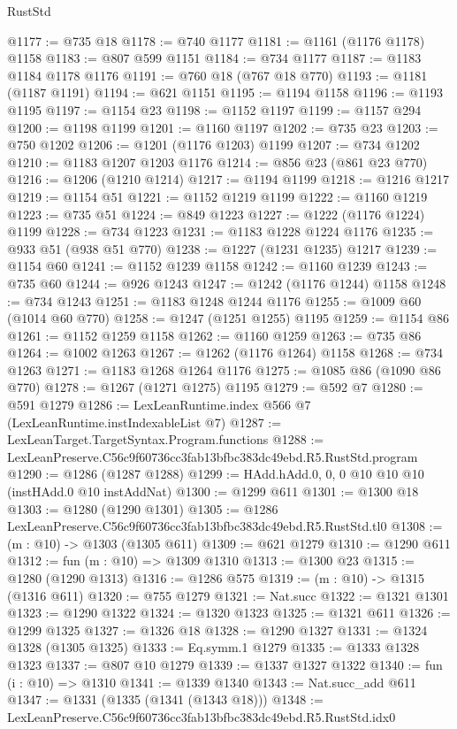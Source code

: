 \begin{lexlean}{RustStd}
\begin{coremodule}
@1177 := @735 @18
@1178 := @740 @1177
@1181 := @1161 (@1176 @1178) @1158
@1183 := @807 @599 @1151
@1184 := @734 @1177
@1187 := @1183 @1184 @1178 @1176
@1191 := @760 @18 (@767 @18 @770)
@1193 := @1181 (@1187 @1191)
@1194 := @621 @1151
@1195 := @1194 @1158
@1196 := @1193 @1195
@1197 := @1154 @23
@1198 := @1152 @1197
@1199 := @1157 @294
@1200 := @1198 @1199
@1201 := @1160 @1197
@1202 := @735 @23
@1203 := @750 @1202
@1206 := @1201 (@1176 @1203) @1199
@1207 := @734 @1202
@1210 := @1183 @1207 @1203 @1176
@1214 := @856 @23 (@861 @23 @770)
@1216 := @1206 (@1210 @1214)
@1217 := @1194 @1199
@1218 := @1216 @1217
@1219 := @1154 @51
@1221 := @1152 @1219 @1199
@1222 := @1160 @1219
@1223 := @735 @51
@1224 := @849 @1223
@1227 := @1222 (@1176 @1224) @1199
@1228 := @734 @1223
@1231 := @1183 @1228 @1224 @1176
@1235 := @933 @51 (@938 @51 @770)
@1238 := @1227 (@1231 @1235) @1217
@1239 := @1154 @60
@1241 := @1152 @1239 @1158
@1242 := @1160 @1239
@1243 := @735 @60
@1244 := @926 @1243
@1247 := @1242 (@1176 @1244) @1158
@1248 := @734 @1243
@1251 := @1183 @1248 @1244 @1176
@1255 := @1009 @60 (@1014 @60 @770)
@1258 := @1247 (@1251 @1255) @1195
@1259 := @1154 @86
@1261 := @1152 @1259 @1158
@1262 := @1160 @1259
@1263 := @735 @86
@1264 := @1002 @1263
@1267 := @1262 (@1176 @1264) @1158
@1268 := @734 @1263
@1271 := @1183 @1268 @1264 @1176
@1275 := @1085 @86 (@1090 @86 @770)
@1278 := @1267 (@1271 @1275) @1195
@1279 := @592 @7
@1280 := @591 @1279
@1286 := LexLeanRuntime.index @566 @7 (LexLeanRuntime.instIndexableList @7)
@1287 := LexLeanTarget.TargetSyntax.Program.functions
@1288 := LexLeanPreserve.C56c9f60736cc3fab13bfbc383dc49ebd.R5.RustStd.program
@1290 := @1286 (@1287 @1288)
@1299 := HAdd.hAdd.{0, 0, 0} @10 @10 @10 (instHAdd.{0} @10 instAddNat)
@1300 := @1299 @611
@1301 := @1300 @18
@1303 := @1280 (@1290 @1301)
@1305 := @1286 LexLeanPreserve.C56c9f60736cc3fab13bfbc383dc49ebd.R5.RustStd.tl0
@1308 := (m : @10) -> @1303 (@1305 @611)
@1309 := @621 @1279
@1310 := @1290 @611
@1312 := fun (m : @10) => @1309 @1310
@1313 := @1300 @23
@1315 := @1280 (@1290 @1313)
@1316 := @1286 @575
@1319 := (m : @10) -> @1315 (@1316 @611)
@1320 := @755 @1279
@1321 := Nat.succ
@1322 := @1321 @1301
@1323 := @1290 @1322
@1324 := @1320 @1323
@1325 := @1321 @611
@1326 := @1299 @1325
@1327 := @1326 @18
@1328 := @1290 @1327
@1331 := @1324 @1328 (@1305 @1325)
@1333 := Eq.symm.{1} @1279
@1335 := @1333 @1328 @1323
@1337 := @807 @10 @1279
@1339 := @1337 @1327 @1322
@1340 := fun (i : @10) => @1310
@1341 := @1339 @1340
@1343 := Nat.succ_add @611
@1347 := @1331 (@1335 (@1341 (@1343 @18)))
@1348 := LexLeanPreserve.C56c9f60736cc3fab13bfbc383dc49ebd.R5.RustStd.idx0

\end{coremodule}
\end{lexlean}
